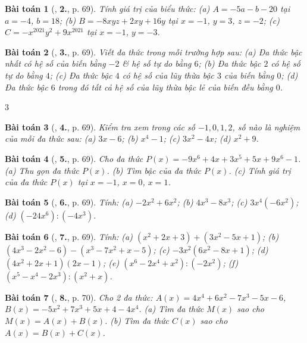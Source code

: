 \documentclass{article}
\numberwithin{equation}{section}
\newtheorem{baitoan}{Bài toán}
\begin{document}
\begin{baitoan}[\cite{SGK_Toan_7_Canh_Dieu_tap_2}, \textbf{2.}, p. 69]
	Tính giá trị của biểu thức: (a) $A = -5a - b - 20$ tại $a = -4$, $b = 18$; (b) $B = -8xyz + 2xy + 16y$ tại $x = -1$, $y = 3$, $z = -2$; (c) $C = -x^{2021}y^2 + 9x^{2021}$ tại $x = -1$, $y = -3$.
\end{baitoan}

\begin{baitoan}[\cite{SGK_Toan_7_Canh_Dieu_tap_2}, \textbf{3.}, p. 69]
	Viết đa thức trong mỗi trường hợp sau: (a) Đa thức bậc nhất có hệ số của biến bằng $-2$ \& hệ số tự do bằng $6$; (b) Đa thức bậc $2$ có hệ số tự do bằng $4$; (c) Đa thức bậc $4$ có hệ số của lũy thừa bậc $3$ của biến bằng $0$; (d) Đa thức bậc $6$  trong đó tất cả hệ số của lũy thừa bậc lẻ của biến đều bằng $0$. 
\end{baitoan}3

\begin{baitoan}[\cite{SGK_Toan_7_Canh_Dieu_tap_2}, \textbf{4.}, p. 69]
	Kiểm tra xem trong các số $-1,0,1,2$, số nào là nghiệm của mỗi đa thức sau: (a) $3x - 6$; (b) $x^4 - 1$; (c) $3x^2 - 4x$; (d) $x^2 + 9$.
\end{baitoan}

\begin{baitoan}[\cite{SGK_Toan_7_Canh_Dieu_tap_2}, \textbf{5.}, p. 69]
	Cho đa thức $P(x) = -9x^6 + 4x + 3x^5 + 5x + 9x^6 - 1$. (a) Thu gọn đa thức $P(x)$. (b) Tìm bậc của đa thức $P(x)$. (c) Tính giá trị của đa thức $P(x)$ tại $x = -1$, $x = 0$, $x = 1$.
\end{baitoan}

\begin{baitoan}[\cite{SGK_Toan_7_Canh_Dieu_tap_2}, \textbf{6.}, p. 69]
	Tính: (a) $-2x^2 + 6x^2$; (b) $4x^3 - 8x^3$; (c) $3x^4(-6x^2)$; (d) $(-24x^6):(-4x^3)$.
\end{baitoan}

\begin{baitoan}[\cite{SGK_Toan_7_Canh_Dieu_tap_2}, \textbf{7.}, p. 69]
	Tính: (a) $(x^2 + 2x + 3) + (3x^2 - 5x + 1)$; (b) $(4x^3 - 2x^2 - 6) - (x^3 - 7x^2 + x - 5)$; (c) $-3x^2(6x^2 - 8x + 1)$; (d) $(4x^2 + 2x + 1)(2x - 1)$; (e) $(x^6 - 2x^4 + x^2):(-2x^2)$; (f) $(x^5 - x^4 - 2x^3):(x^2 + x)$.
\end{baitoan}

\begin{baitoan}[\cite{SGK_Toan_7_Canh_Dieu_tap_2}, \textbf{8.}, p. 70]
	Cho 2 đa thức: $A(x) = 4x^4 + 6x^2 - 7x^3 - 5x - 6$, $B(x) = -5x^2 + 7x^3 + 5x + 4 - 4x^4$. (a) Tìm đa thức $M(x)$ sao cho $M(x) = A(x) + B(x)$. (b) Tìm đa thức $C(x)$ sao cho $A(x) = B(x) + C(x)$.
\end{baitoan}
\end{document}
